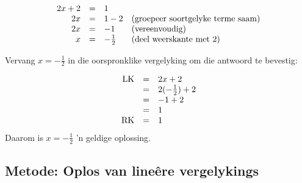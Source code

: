 % 
% 
\begin{equation*}
  \begin{array}{ccll}\hfill 2x+2& =& 1\hfill \\ 
      \hfill 2x& =& 1-2\hfill & \mbox{(groepeer soortgelyke terme saam)}\hfill \\ 
      \hfill 2x& =& -1\hfill & \mbox{(vereenvoudig)}\hfill \\
\hfill x&=& -\frac{1}{2} & \mbox{(deel weerskante met $2$)} \hfill
  \end{array}
\end{equation*}

\begin{equation*}

\end{equation*}
Vervang  $x=-\frac{1}{2}$ in die oorspronklike vergelyking om die antwoord te bevestig:

\begin{equation*}
    \begin{array}{ccl}\hfill \mbox{LK}& =& 2x+2\hfill \\
	  & =& 2(-\frac{1}{2})+2\hfill \\
	  & =& -1+2\hfill \\
	  & =& 1\hfill \\
	  \hfill \mbox{RK}& =& 1\hfill \\
    \end{array}
\end{equation*}
Daarom is $x = -\frac{1}{2}$ 'n geldige oplossing.


\subsection*{Metode: Oplos van lineêre vergelykings}

